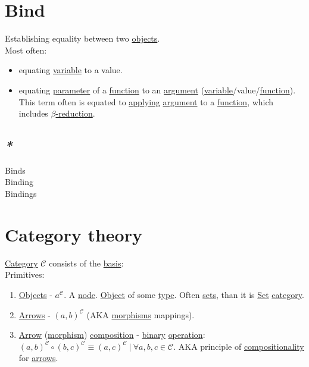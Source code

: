 \documentclass[a4paper,14pt,oneside]{book}
\begin{document}
\chapter{\label{orgec29b54}Bind}
\label{sec:orge9ba545}
Establishing equality between two \hyperref[org67f2abd]{objects}.\\

Most often:\\
\begin{itemize}
\item equating \hyperref[org2a8e721]{variable} to a value.\\
\item equating \hyperref[orgd362766]{parameter} of a \hyperref[org9530a6b]{function} to an \hyperref[org86f3f7b]{argument} (\hyperref[org2a8e721]{variable}/value/\hyperref[org9530a6b]{function}). This term often is equated to \hyperref[orgb099934]{applying} \hyperref[org86f3f7b]{argument} to a \hyperref[org9530a6b]{function}, which includes \hyperref[org6d482ad]{\(\beta\)-reduction}.\\
\end{itemize}

\section{\emph{*}}
\label{sec:org0c5cc43}

\label{org2cd2402}Binds\\
\label{orgf4d58db}Binding\\
\label{org3429cb2}Bindings\\

\chapter{\label{org5d876a9}Category theory}
\label{sec:org3ae18ae}
\hyperref[org3a5c6d7]{Category} \(\mathcal{C}\) consists of the \hyperref[org9cb947f]{basis}:\\

Primitives:\\
\begin{enumerate}
\item \hyperref[org67f2abd]{Objects} - \(a^{\mathcal{C}}\). A \hyperref[orgded5d41]{node}. \hyperref[org65d2cb0]{Object} of some \hyperref[org35b9249]{type}. Often \hyperref[orgcfe0436]{sets}, than it is \hyperref[orgc6fbcf3]{Set} \hyperref[org3a5c6d7]{category}.\\
\item \hyperref[org224bb22]{Arrows} - \({(a,b)}^{\mathcal{C}}\) (AKA \hyperref[orgb352465]{morphisms} mappings).\\
\item \hyperref[org4fc25c7]{Arrow} (\hyperref[orgc908564]{morphism}) \hyperref[org309d77e]{composition} - \hyperref[orga442c45]{binary} \hyperref[orgbac7378]{operation}: \({(a, b)}^{\mathcal{C}} \circ {(b, c)}^{\mathcal{C}} \equiv {(a, c)}^{\mathcal{C}} \ | \ \forall a, b, c \in \mathcal{C}\). AKA principle of \hyperref[org94c8125]{compositionality} for \hyperref[org224bb22]{arrows}.\\
\end{enumerate}
\end{document}
